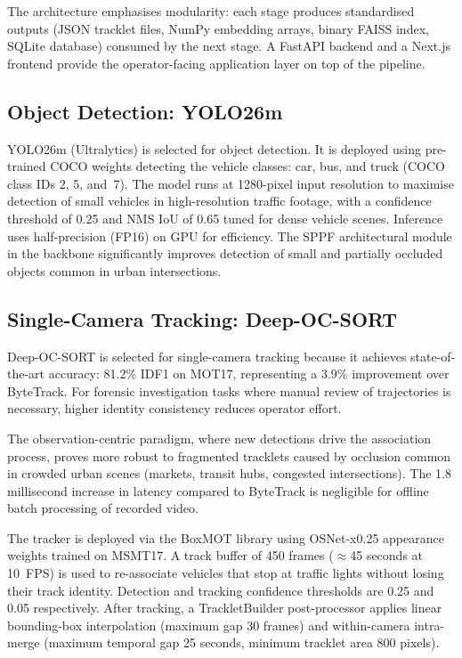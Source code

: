The architecture emphasises modularity: each stage produces standardised outputs (JSON tracklet files, NumPy embedding arrays, binary FAISS index, SQLite database) consumed by the next stage. A FastAPI backend and a Next.js frontend provide the operator-facing application layer on top of the pipeline.

\subsection{Object Detection: YOLO26m}

YOLO26m (Ultralytics) is selected for object detection. It is deployed using pre-trained COCO weights detecting the vehicle classes: car, bus, and truck (COCO class IDs 2, 5, and~7). The model runs at 1280-pixel input resolution to maximise detection of small vehicles in high-resolution traffic footage, with a confidence threshold of 0.25 and NMS IoU of 0.65 tuned for dense vehicle scenes. Inference uses half-precision (FP16) on GPU for efficiency. The SPPF architectural module in the backbone significantly improves detection of small and partially occluded objects common in urban intersections.

\subsection{Single-Camera Tracking: Deep-OC-SORT}

Deep-OC-SORT is selected for single-camera tracking because it achieves state-of-the-art accuracy: 81.2\% IDF1 on MOT17, representing a 3.9\% improvement over ByteTrack. For forensic investigation tasks where manual review of trajectories is necessary, higher identity consistency reduces operator effort.

The observation-centric paradigm, where new detections drive the association process, proves more robust to fragmented tracklets caused by occlusion common in crowded urban scenes (markets, transit hubs, congested intersections). The 1.8 millisecond increase in latency compared to ByteTrack is negligible for offline batch processing of recorded video.

The tracker is deployed via the BoxMOT library using OSNet-x0.25 appearance weights trained on MSMT17. A track buffer of 450 frames ($\approx$45 seconds at 10~FPS) is used to re-associate vehicles that stop at traffic lights without losing their track identity. Detection and tracking confidence thresholds are 0.25 and 0.05 respectively. After tracking, a TrackletBuilder post-processor applies linear bounding-box interpolation (maximum gap 30 frames) and within-camera intra-merge (maximum temporal gap 25 seconds, minimum tracklet area 800 pixels).




